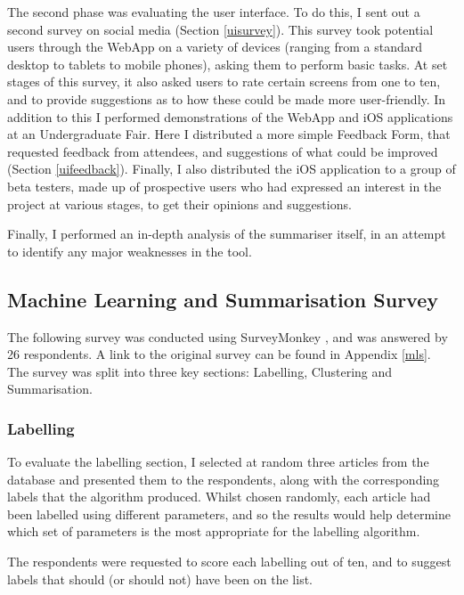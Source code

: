 \documentclass[12pt]{article}
\begin{document}
The second phase was evaluating the user interface. To do this, I sent out a second survey on social media (Section \ref{uisurvey}). This survey took potential users through the WebApp on a variety of devices (ranging from a standard desktop to tablets to mobile phones), asking them to perform basic tasks. At set stages of this survey, it also asked users to rate certain screens from one to ten, and to provide suggestions as to how these could be made more user-friendly. In addition to this I performed demonstrations of the WebApp and iOS applications at an Undergraduate Fair. Here I distributed a more simple Feedback Form, that requested feedback from attendees, and suggestions of what could be improved (Section \ref{uifeedback}). Finally, I also distributed the iOS application to a group of beta testers, made up of prospective users who had expressed an interest in the project at various stages, to get their opinions and suggestions.

Finally, I performed an in-depth analysis of the summariser itself, in an attempt to identify any major weaknesses in the tool. 

\subsection{Machine Learning and Summarisation Survey}

\label{mlsurvey}

The following survey was conducted using SurveyMonkey \cite{surveymonkey}, and was answered by 26 respondents. A link to the original survey can be found in Appendix \ref{mls}. The survey was split into three key sections: Labelling, Clustering and Summarisation. 

\subsubsection{Labelling}

To evaluate the labelling section, I selected at random three articles from the database and presented them to the respondents, along with the corresponding labels that the algorithm produced. Whilst chosen randomly, each article had been labelled using different parameters, and so the results would help determine which set of parameters is the most appropriate for the labelling algorithm.

The respondents were requested to score each labelling out of ten, and to suggest labels that should (or should not) have been on the list. \\
\end{document}
